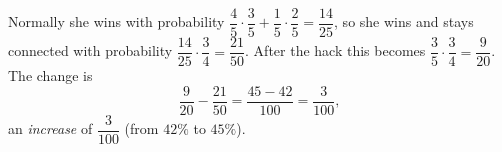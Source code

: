 Normally she wins with probability $\dfrac45\cdot\dfrac35+\dfrac15\cdot\dfrac25=\dfrac{14}{25}$, so she wins and stays connected with probability $\dfrac{14}{25}\cdot\dfrac34=\dfrac{21}{50}$. After the hack this becomes $\dfrac35\cdot\dfrac34=\dfrac9{20}$. The change is
\[\dfrac9{20}-\dfrac{21}{50}=\dfrac{45-42}{100}=\dfrac3{100},\]
an \emph{increase} of $\boxed{\dfrac3{100}}$ (from $42\%$ to $45\%$).
